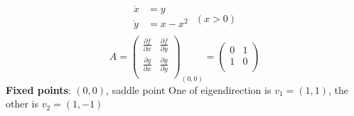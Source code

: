 \documentclass[9pt,aspectratio=43,mathserif,table]{beamer}
\begin{document}
\begin{frame}
	$$
	\begin{aligned}
		\dot{x}&=y\\
		\dot{y}&=x-x^2\\
	\end{aligned}\,\, \left( x>0 \right) \,\,
	$$
	$$
	A=\left( \begin{matrix}
		\frac{\partial f}{\partial x}&		\frac{\partial f}{\partial y}\\
		\frac{\partial g}{\partial x}&		\frac{\partial g}{\partial y}\\
	\end{matrix} \right) _{\left( 0,0 \right)}=\left( \begin{matrix}
		0&		1\\
		1&		0\\
	\end{matrix} \right) 
	$$
	\textbf{Fixed points}: $(0,0)$, saddle point
	One of eigendirection is $v_1=(1,1)$, the other is $v_2=(1,-1)$


\end{frame}
\end{document}
